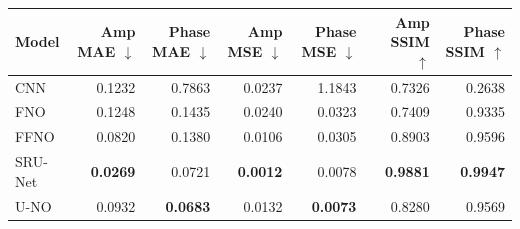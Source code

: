 \begin{tabular}{lrrrrrr}
\toprule
Model & Amp MAE $\downarrow$ & Phase MAE $\downarrow$ & Amp MSE $\downarrow$ & Phase MSE $\downarrow$ & Amp SSIM $\uparrow$ & Phase SSIM $\uparrow$ \\
\midrule
CNN & 0.1232 & 0.7863 & 0.0237 & 1.1843 & 0.7326 & 0.2638 \\
FNO & 0.1248 & 0.1435 & 0.0240 & 0.0323 & 0.7409 & 0.9335 \\
FFNO & 0.0820 & 0.1380 & 0.0106 & 0.0305 & 0.8903 & 0.9596 \\
SRU-Net & \textbf{0.0269} & 0.0721 & \textbf{0.0012} & 0.0078 & \textbf{0.9881} & \textbf{0.9947} \\
U-NO & 0.0932 & \textbf{0.0683} & 0.0132 & \textbf{0.0073} & 0.8280 & 0.9569 \\
\bottomrule
\end{tabular}
